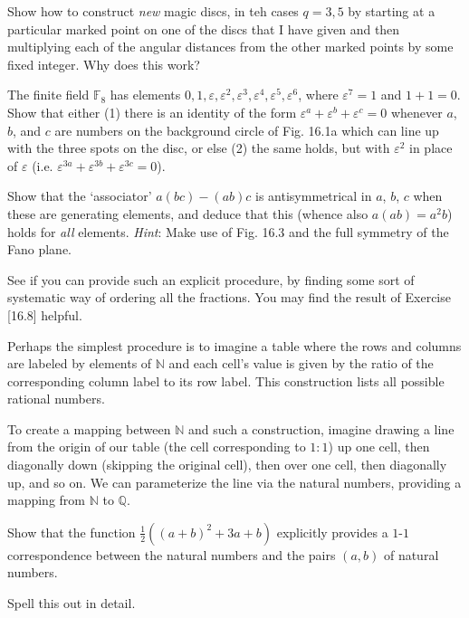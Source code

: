 \documentclass[../the-road-to-reality.tex]{subfiles}
\begin{document}
\begin{questions}
	\question Show how to construct \textit{new} magic discs, in teh cases $q=3,5$
	by starting at a particular marked point on one of the discs that I have
	given and then multiplying each of the angular distances from the other
	marked points by some fixed integer. Why does this work?

	\question The finite field $\mathbb{F}_8$ has elements $0, 1, \varepsilon,
	\varepsilon^2, \varepsilon^3, \varepsilon^4, \varepsilon^5,
	\varepsilon^6$, where $\varepsilon^7=1$ and $1+1=0$. Show that either (1)
	there is an identity of the form $\varepsilon^a + \varepsilon^b +
	\varepsilon^c=0$ whenever $a$, $b$, and $c$ are numbers on the background
	circle of Fig. 16.1a which can line up with the three spots on the disc,
	or else (2) the same holds, but with $\varepsilon^2$ in place of
	$\varepsilon$ (i.e. $\varepsilon^{3a} + \varepsilon^{3b} + \varepsilon^{3c}
	= 0$).

	\question Show that the `associator' $a(bc) - (ab)c$ is antisymmetrical in
	$a$, $b$, $c$ when these are generating elements, and deduce that this
	(whence also $a(ab) = a^2b$) holds for \textit{all} elements.
	\textit{Hint}: Make use of Fig. 16.3 and the full symmetry of the Fano
	plane.

	\question See if you can provide such an explicit procedure, by finding
	some sort of systematic way of ordering all the fractions. You may find
	the result of Exercise [16.8] helpful.

	\begin{solution}
		Perhaps the simplest procedure is to imagine a table where the rows and columns are labeled by elements of $\mathbb{N}$ and each cell's value is given by the ratio of the corresponding column label to its row label. This construction lists all possible rational numbers.

		To create a mapping between $\mathbb{N}$ and such a construction, imagine drawing a line from the origin of our table (the cell corresponding to $1:1$) up one cell, then diagonally down (skipping the original cell), then over one cell, then diagonally up, and so on. We can parameterize the line via the natural numbers, providing a mapping from $\mathbb{N}$ to $\mathbb{Q}$.
	\end{solution}

	\question Show that the function $\frac{1}{2}((a+b)^2+3a+b)$ explicitly
	provides a $1$-$1$ correspondence between the natural numbers and the
	pairs $(a, b)$ of natural numbers.

	\question Spell this out in detail.


\end{questions}
\end{document}
